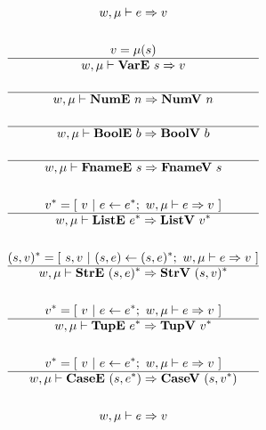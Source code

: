 
\begin{gather*}
  w, \mu \vdash e \Rightarrow v \\
%
\newline \\
  v = \mu(s) \\
  \hline
  w, \mu \vdash \vare ~ s \Rightarrow v \\
%
\newline \\
  \hline
  w, \mu \vdash \nume ~ n \Rightarrow \numv ~ n \\
%
\newline \\
  \hline
  w, \mu \vdash \boole ~ b \Rightarrow \boolv ~ b \\
%
\newline \\
  \hline
  w, \mu \vdash \fnamee ~ s \Rightarrow \fnamev ~ s \\
%
\newline \\
  \seq{v} = [ ~ v ~ | ~ e \leftarrow \seq{e}; ~ w, \mu \vdash e \Rightarrow v ~ ] \\
  \hline
  w, \mu \vdash \liste ~ \seq{e} \Rightarrow \listv ~ \seq{v} \\
%
\newline \\
  \seq{(s, v)} =
    [ ~
      s, v
    ~ | ~
      (s, e) \leftarrow \seq{(s, e)}; ~ w, \mu \vdash e \Rightarrow v
    ~ ] \\
  \hline
  w, \mu \vdash \stre ~ \seq{(s, e)} \Rightarrow \strv ~ \seq{(s, v)} \\
%
\newline \\
  \seq{v} = [ ~ v ~ | ~ e \leftarrow \seq{e}; ~ w, \mu \vdash e \Rightarrow v ~ ] \\
  \hline
  w, \mu \vdash \tupe ~ \seq{e} \Rightarrow \tupv ~ \seq{v} \\
%
\newline \\
  \seq{v} = [ ~ v ~ | ~ e \leftarrow \seq{e}; ~ w, \mu \vdash e \Rightarrow v ~ ] \\
  \hline
  w, \mu \vdash \casee ~ (s, \seq{e}) \Rightarrow \casev ~ (s, \seq{v}) \\
%
\newline \\
  w, \mu \vdash e \Rightarrow v \\

\end{gather*}
